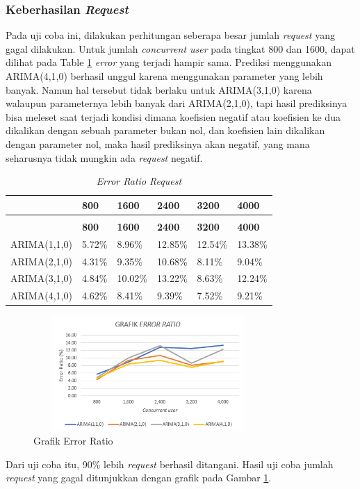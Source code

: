 \subsubsection{Keberhasilan \textit{Request}}
Pada uji coba ini, dilakukan perhitungan seberapa besar jumlah \textit{request} yang gagal dilakukan. Untuk jumlah \textit{concurrent user} pada tingkat 800 dan 1600, dapat dilihat pada Table \ref{keberhasilanrequest} \textit{error} yang terjadi hampir sama. Prediksi menggunakan ARIMA(4,1,0) berhasil unggul karena menggunakan parameter yang lebih banyak. Namun hal tersebut tidak berlaku untuk ARIMA(3,1,0) karena walaupun parameternya lebih banyak dari ARIMA(2,1,0), tapi hasil prediksinya bisa meleset saat terjadi kondisi dimana koefisien negatif atau koefisien ke dua dikalikan dengan sebuah parameter bukan nol, dan koefisien lain dikalikan dengan parameter nol, maka hasil prediksinya akan negatif, yang mana seharusnya tidak mungkin ada \textit{request} negatif.
\begin{longtable}{|p{}|p{}|p{}|p{}|p{}|p{}|}
	\caption{\textit{Error Ratio Request}} \label{keberhasilanrequest} \\
	\hline
	& \textbf{800} & \textbf{1600} & \textbf{2400} & \textbf{3200} & \textbf{4000} \\ \hline
	\endfirsthead
	\caption[]{\textit{Error Ratio Request}} \\
	\hline
	& \textbf{800} & \textbf{1600} & \textbf{2400} & \textbf{3200} & \textbf{4000} \\ \hline
	\endhead
	\endfoot
	\endlastfoot
	
	ARIMA(1,1,0) & 5.72\% & 8.96\% & 12.85\% & 12.54\% & 13.38\% \\ \hline
	ARIMA(2,1,0) & 4.31\% & 9.35\% & 10.68\% & 8.11\% & 9.04\% \\ \hline
	ARIMA(3,1,0) & 4.84\% & 10.02\% & 13.22\% & 8.63\% & 12.24\% \\ \hline
	ARIMA(4,1,0) & 4.62\% & 8.41\% & 9.39\% & 7.52\% & 9.21\% \\ \hline
\end{longtable}

\begin{figure}[H]
	\centering
	\includegraphics[width=8.7cm,height=4.4cm]{Images/C-5/errorratio.png}
	\caption{Grafik Error Ratio}
	\label{gerrorratio}
\end{figure}
Dari uji coba itu, 90\% lebih \textit{request} berhasil ditangani. Hasil uji coba jumlah \textit{request} yang gagal ditunjukkan dengan grafik pada Gambar \ref{gerrorratio}.